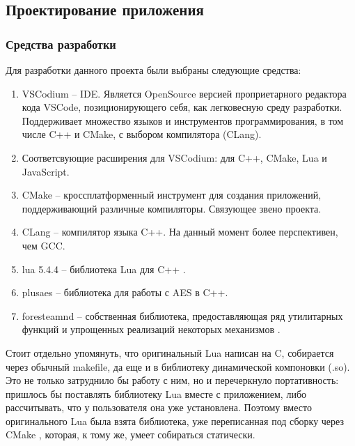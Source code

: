 \subsection{Проектирование приложения}

\subsubsection{Средства разработки}
Для разработки данного проекта были выбраны следующие средства:

\begin{enumerate}
	\item VSCodium -- IDE. Является OpenSource версией проприетарного редактора кода VSCode, позиционирующего себя, как легковесную среду разработки. Поддерживает множество языков  и инструментов программирования, в том числе C++ и CMake, с выбором компилятора (CLang).
	\item Соответсвующие расширения для VSCodium: для C++, CMake, Lua и JavaScript.
	\item CMake -- кроссплатформенный инструмент для создания приложений, поддерживающий различные компиляторы. Связующее звено проекта.
	\item CLang -- компилятор языка C++. На данный момент более перспективен, чем GCC.
	\item lua 5.4.4 -- библиотека Lua для C++ \cite{lua_cmake}.
	\item plusaes -- библиотека для работы с AES в C++.
	\item foresteamnd -- собственная библиотека, предоставляющая ряд утилитарных функций и упрощенных реализаций некоторых механизмов \cite{foresteamnd}.
\end{enumerate}

Стоит отдельно упомянуть, что оригинальный Lua написан на C, собирается через обычный makefile, да еще и в библиотеку динамической компоновки (.so). Это не только затруднило бы работу с ним, но и перечеркнуло портативность: пришлось бы поставлять библиотеку Lua вместе с приложением, либо рассчитывать, что у пользователя она уже установлена. Поэтому вместо оригинального Lua была взята библиотека, уже переписанная под сборку через CMake \cite{lua_cmake}, которая, к тому же, умеет собираться статически.
\clearpage

